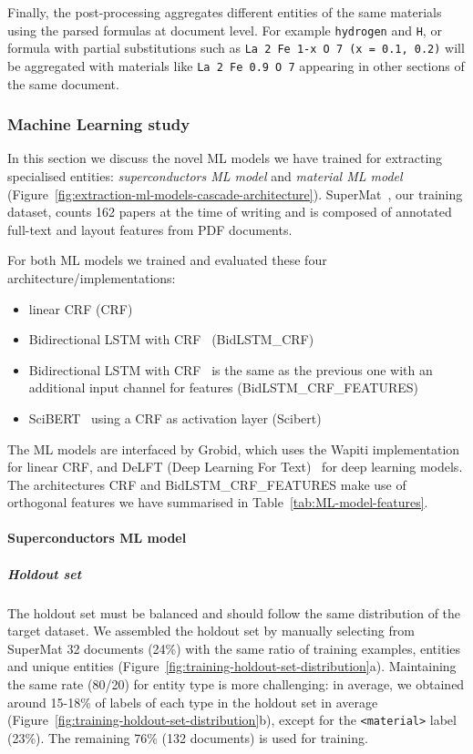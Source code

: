 \documentclass{article}
\begin{document}
Finally, the post-processing aggregates different entities of the same materials using the parsed formulas at document level. 
For example \texttt{hydrogen} and \texttt{H}, or formula with partial substitutions such as \texttt{La 2 Fe 1-x O 7 (x = 0.1, 0.2)} will be aggregated with materials like \texttt{La 2 Fe 0.9 O 7} appearing in other sections of the same document. 

\subsubsection{Machine Learning study}

In this section we discuss the novel ML models we have trained for extracting specialised entities: \textit{superconductors ML model} and \textit{material ML model} (Figure~\ref{fig:extraction-ml-models-cascade-architecture}). 
SuperMat~\cite{foppiano2021supermat}, our training dataset, counts 162 papers at the time of writing and is composed of annotated full-text and layout features from PDF documents. 

For both ML models we trained and evaluated these four architecture/implementations: 
\begin{itemize}
    \item linear CRF (CRF)
    \item Bidirectional LSTM with CRF~\cite{Lample2016NeuralAF} (BidLSTM\_CRF)
    \item Bidirectional LSTM with CRF~\cite{Lample2016NeuralAF} is the same as the previous one with an additional input channel for features (BidLSTM\_CRF\_FEATURES)
    \item SciBERT~\cite{Beltagy2019SciBERT} using a CRF as activation layer (Scibert)
\end{itemize}

The ML models are interfaced by Grobid, which uses the Wapiti\cite{lavergne2010practical} implementation for linear CRF, and DeLFT (Deep Learning For Text)~\cite{DeLFT} for deep learning models.
The architectures CRF and BidLSTM\_CRF\_FEATURES make use of orthogonal features we have summarised in Table~\ref{tab:ML-model-features}. 

\paragraph{Superconductors ML model}

\subparagraph{Holdout set}
The holdout set must be balanced and should follow the same distribution of the target dataset. 
We assembled the holdout set by manually selecting from SuperMat 32 documents (24\%) with the same ratio of training examples, entities and unique entities (Figure~\ref{fig:training-holdout-set-distribution}a).
Maintaining the same rate (80/20) for entity type is more challenging: in average, we obtained around 15-18\% of labels of each type in the holdout set in average (Figure~\ref{fig:training-holdout-set-distribution}b), except for the \texttt{<material>} label (23\%). %
The remaining 76\% (132 documents) is used for training. 
\end{document}
